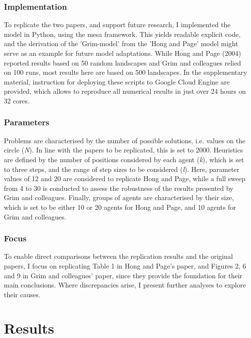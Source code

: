 \subsubsection{Implementation}

To replicate the two papers, and support future research, I implemented the model in Python, using the mesa framework.\supercite{kazil2020utilizing} This yields readable explicit code, and the derivation of the 'Grim-model' from the 'Hong and Page' model might serve as an example for future model adaptations. While Hong and Page (2004) reported results based on 50 random landscapes and Grim and colleagues relied on 100 runs, most results here are based on 500 landscapes. In the supplementary material, instruction for deploying these scripts to Google Cloud Engine are provided, which allows to reproduce all numerical results in just over 24 hours on 32 cores.

\subsubsection{Parameters}

Problems are characterised by the number of possible solutions, i.e. values on the circle (\emph{N}). In line with the papers to be replicated, this is set to 2000. Heuristics are defined by the number of positions considered by each agent (\emph{k}), which is set to three steps, and the range of step sizes to be considered (\emph{l}). Here, parameter values of 12 and 20 are considered to replicate Hong and Page, while a full sweep from 4 to 30 is conducted to assess the robustness of the results presented by Grim and colleagues. Finally, groups of agents are characterised by their size, which is set to be either 10 or 20 agents for Hong and Page, and 10 agents for Grim and colleagues.

\subsubsection{Focus}

To enable direct comparisons between the replication results and the original papers, I focus on replicating Table 1 in Hong and Page's paper, and Figures 2, 6 and 9 in Grim and colleagues' paper, since they provide the foundation for their main conclusions. Where discrepancies arise, I present further analyses to explore their causes.

\section{Results}

